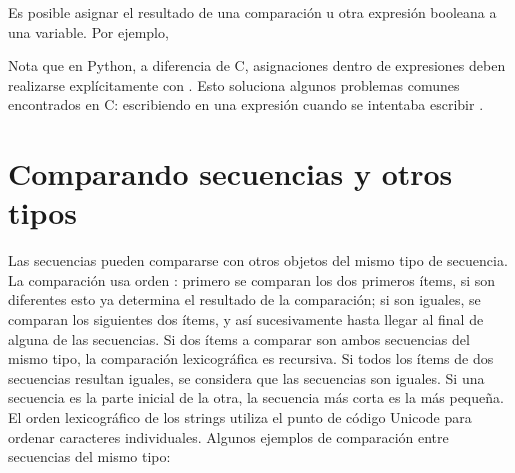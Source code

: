 \documentclass[a4,10pt,spanish]{sphinxmanual}
\begin{document}
\sphinxAtStartPar
Es posible asignar el resultado de una comparación u otra expresión booleana a una variable.  Por ejemplo,

\begin{sphinxVerbatim}[commandchars=\\\{\}]
      
      
\end{sphinxVerbatim}

\sphinxAtStartPar
Nota que en Python, a diferencia de C, asignaciones dentro de expresiones deben realizarse explícitamente con  \sphinxcode{\sphinxupquote{:=}}. Esto soluciona algunos problemas comunes encontrados en C: escribiendo \sphinxcode{\sphinxupquote{=}} en una expresión cuando se intentaba escribir \sphinxcode{\sphinxupquote{==}}.


\section{Comparando secuencias y otros tipos}
\label{\detokenize{tutorial/datastructures:comparing-sequences-and-other-types}}\label{\detokenize{tutorial/datastructures:tut-comparing}}
\sphinxAtStartPar
Las secuencias pueden compararse con otros objetos del mismo tipo de secuencia. La comparación usa orden : primero se comparan los dos primeros ítems, si son diferentes esto ya determina el resultado de la comparación; si son iguales, se comparan los siguientes dos ítems, y así sucesivamente hasta llegar al final de alguna de las secuencias. Si dos ítems a comparar son ambos secuencias del mismo tipo, la comparación lexicográfica es recursiva.  Si todos los ítems de dos secuencias resultan iguales, se considera que las secuencias son iguales. Si una secuencia es la parte inicial de la otra, la secuencia más corta es la más pequeña. El orden lexicográfico de los strings utiliza el punto de código Unicode para ordenar caracteres individuales. Algunos ejemplos de comparación entre secuencias del mismo tipo:
\end{document}
